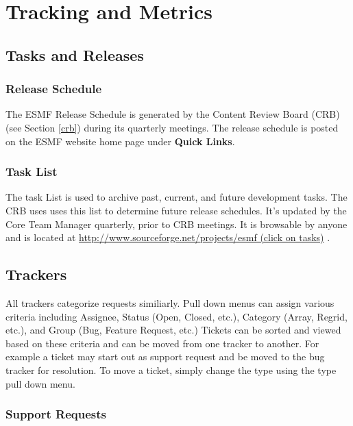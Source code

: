 
\section{Tracking and Metrics}
\label{sec:tracking}

\subsection{Tasks and Releases}
\label{sec:build}

\subsubsection{Release Schedule}
The ESMF Release Schedule is generated by the Content Review Board (CRB) (see Section \autoref{crb}) during its quarterly meetings.  The release schedule is posted on the ESMF website home page under {\bf Quick Links}.

\subsubsection{Task List}

The task List is used to archive past, current, and future development tasks.  The CRB uses uses this list to determine future release schedules.  It's updated by the Core Team Manager quarterly, prior to CRB meetings.  It is browsable by anyone and is located at
\href{http://www.sourceforge.net/projects/esmf}{http://www.sourceforge.net/projects/esmf (click on tasks)} .

\subsection{Trackers}
\label{sec:tracking_tools}

All trackers categorize requests similiarly. Pull down menus can assign various criteria including Assignee, Status (Open, Closed, etc.), Category (Array, Regrid, etc.), and Group (Bug, Feature Request, etc.)  Tickets can be sorted and viewed based on these criteria and can be moved from one tracker to another. For example a ticket may start out as support request and be moved to the bug tracker for resolution.  To move a ticket, simply change the type using the type pull down menu. 

\subsubsection{Support Requests}

